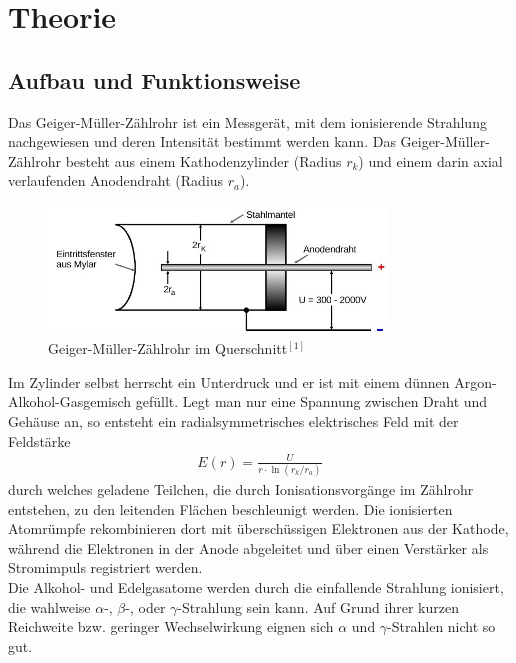 
\section{Theorie}
\subsection{Aufbau und Funktionsweise}
Das Geiger-Müller-Zählrohr ist ein Messgerät, mit dem ionisierende Strahlung nachgewiesen und deren Intensität bestimmt werden kann. Das Geiger-Müller-Zählrohr besteht aus einem Kathodenzylinder (Radius $r_k$) und einem darin axial verlaufenden Anodendraht (Radius $r_a$).
\begin{figure}[htbp]
\includegraphics[width=0.8\textwidth]{pics/zaehlrohr.jpg}
\caption{Geiger-Müller-Zählrohr im Querschnitt$^{[1]}$}
\end{figure}
Im Zylinder selbst herrscht ein Unterdruck und er ist mit einem dünnen Argon-Alkohol-Gasgemisch gefüllt. Legt man nur eine Spannung zwischen Draht und Gehäuse an, so entsteht ein radialsymmetrisches elektrisches Feld mit der Feldstärke
\begin{align}
E(r)= \frac{U}{r\cdot \ln (r_k / r_a)}
\label{eq_efeld}
\end{align}
durch welches geladene Teilchen, die durch Ionisationsvorgänge im Zählrohr entstehen, zu den leitenden Flächen beschleunigt werden. Die ionisierten Atomrümpfe rekombinieren dort mit überschüssigen Elektronen aus der Kathode, während die Elektronen in der Anode abgeleitet und über einen Verstärker als Stromimpuls registriert werden.\\

Die Alkohol- und Edelgasatome werden durch die einfallende Strahlung ionisiert, die wahlweise $\alpha$-, $\beta$-, oder $\gamma$-Strahlung sein kann. Auf Grund ihrer kurzen Reichweite bzw. geringer Wechselwirkung eignen sich $\alpha \text{ und } \gamma$-Strahlen nicht so gut.

